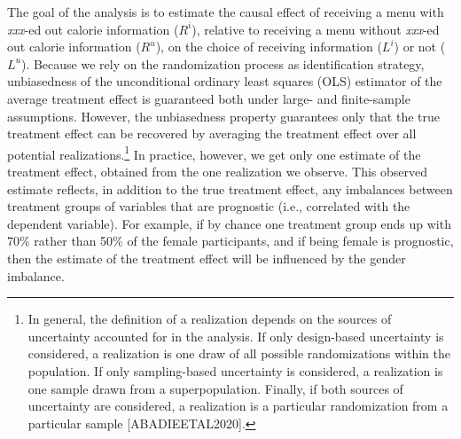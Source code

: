 \documentclass[12pt]{article}
\begin{document}
The goal of the analysis is to estimate the causal effect of receiving a menu with \emph{xxx}-ed out calorie information ($R^i$), relative to receiving a menu without \emph{xxx}-ed out calorie information ($R^u$), on the choice of receiving information ($L^i$) or not ($L^u$). Because we rely on the randomization process as identification strategy, unbiasedness of the unconditional ordinary least squares (OLS) estimator of the average treatment effect is guaranteed both under large- and finite-sample assumptions. However, the unbiasedness property guarantees only that the true treatment effect can be recovered by averaging the treatment effect over all potential realizations.\footnote{In general, the definition of a realization depends on the sources of uncertainty accounted for in the analysis. If only design-based uncertainty is considered, a realization is one draw of all possible randomizations within the population. If only sampling-based uncertainty is considered, a realization is one sample drawn from a superpopulation. Finally, if both sources of uncertainty are considered, a realization is a particular randomization from a particular sample [ABADIEETAL2020].} In practice, however, we get only one estimate of the treatment effect, obtained from the one realization we observe. This observed estimate reflects, in addition to the true treatment effect, any imbalances between treatment groups of variables that are prognostic (i.e., correlated with the dependent variable). For example, if by chance one treatment group ends up with 70\% rather than 50\% of the female participants, and if being female is prognostic, then the estimate of the treatment effect will be influenced by the gender imbalance.
\end{document}
